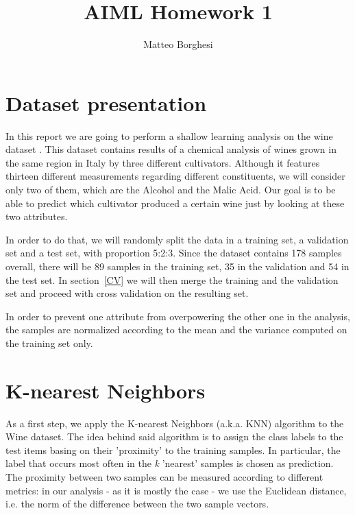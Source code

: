 \documentclass[11pt,twoside,a4paper]{article}
\begin{document}
\title{AIML Homework 1}
\author{Matteo Borghesi}
\maketitle

\section{Dataset presentation}
In this report we are going to perform a shallow learning analysis on the wine dataset . 
This dataset contains results of a chemical analysis of wines grown in the same region in Italy by three different cultivators. Although it features thirteen different measurements regarding different constituents, we will consider only two of them, which are the Alcohol and the Malic Acid. Our goal is to be able to predict which cultivator produced a certain wine just by looking at these two attributes.

In order to do that, we will randomly split the data in a training set, a validation set and a test set, with proportion 5:2:3. Since the dataset contains 178 samples overall, there will be 89 samples in the training set, 35 in the validation and 54 in the test set.
In section~\ref{CV} we will then merge the training and the validation set and proceed with cross validation on the resulting set.

In order to prevent one attribute from overpowering the other one in the analysis, the samples are normalized according to the mean and the variance computed on the training set only.

\section{K-nearest Neighbors}
As a first step, we apply the K-nearest Neighbors (a.k.a. KNN) algorithm to the Wine dataset. The idea behind said algorithm is to assign the class labels to the test items basing on their 'proximity' to the training samples. In particular, the label that occurs most often in the \emph{k} 'nearest' samples is chosen as prediction. The proximity between two samples can be measured according to different metrics: in our analysis - as it is mostly the case - we use the Euclidean distance, i.e. the norm of the difference between the two sample vectors.
\end{document}
